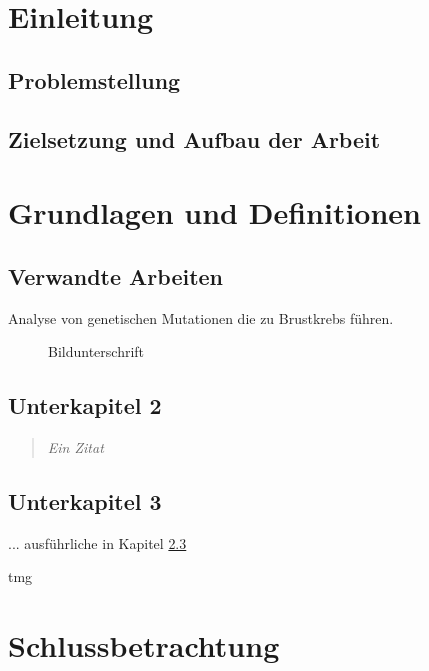 




		

		
\chapter{Einleitung}
	
\section{Problemstellung}
	
		
	\section{Zielsetzung und Aufbau der Arbeit}
		 
		
		
\chapter{Grundlagen und Definitionen}
	
	
	\section{Verwandte Arbeiten}
	Analyse von genetischen Mutationen die zu Brustkrebs führen.	
	
		\begin{figure}[htbp]
			\centering
			\caption[xxx]{Bildunterschrift}
			\label{xxx}
		\end{figure}
		
			
	\section{Unterkapitel 2}
		
		\begin{quote}
			\textit{Ein Zitat}
		\end{quote}

	\section{Unterkapitel 3}	\label{Kapitel_xxx} %
		... ausführliche in Kapitel \ref{Kapitel_xxx}

				\autocite[20]{Backhaus.2011}
				
	\gls{tmg}

\chapter{Schlussbetrachtung}


\newpage


{}




